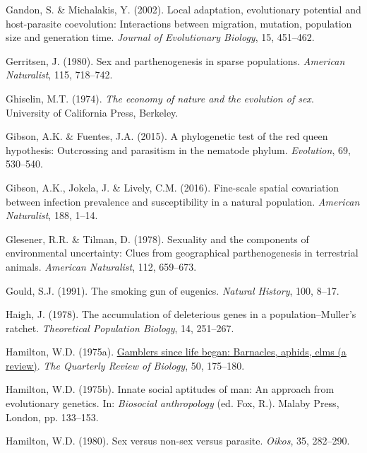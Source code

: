 \documentclass[
  letterpaper,
]{book}
\newlength{\cslhangindent}
\newenvironment{CSLReferences}[2] %
 {\begin{list}{}{%
  \setlength{\itemindent}{0pt}
  \setlength{\leftmargin}{0pt}
  \setlength{\parsep}{0pt}
  \ifodd #1
   \setlength{\leftmargin}{\cslhangindent}
   \setlength{\itemindent}{-1\cslhangindent}
  \fi
  \setlength{\itemsep}{#2\baselineskip}}}
 {\end{list}}
\begin{document}
\begin{CSLReferences}{1}{0}
Gandon, S. \& Michalakis, Y. (2002). Local adaptation, evolutionary
potential and host-parasite coevolution: Interactions between migration,
mutation, population size and generation time. \emph{Journal of
Evolutionary Biology}, 15, 451--462.

Gerritsen, J. (1980). Sex and parthenogenesis in sparse populations.
\emph{American Naturalist}, 115, 718--742.

Ghiselin, M.T. (1974). \emph{The economy of nature and the evolution of
sex}. University of California Press, Berkeley.

Gibson, A.K. \& Fuentes, J.A. (2015). A phylogenetic test of the red
queen hypothesis: Outcrossing and parasitism in the nematode phylum.
\emph{Evolution}, 69, 530--540.

Gibson, A.K., Jokela, J. \& Lively, C.M. (2016). Fine-scale spatial
covariation between infection prevalence and susceptibility in a natural
population. \emph{American Naturalist}, 188, 1--14.

Glesener, R.R. \& Tilman, D. (1978). Sexuality and the components of
environmental uncertainty: Clues from geographical parthenogenesis in
terrestrial animals. \emph{American Naturalist}, 112, 659--673.

Gould, S.J. (1991). The smoking gun of eugenics. \emph{Natural History},
100, 8--17.

Haigh, J. (1978). The accumulation of deleterious genes in a
population--{Muller's} ratchet. \emph{Theoretical Population Biology},
14, 251--267.

Hamilton, W.D. (1975a). \href{https://doi.org/10.1086/408439}{Gamblers
since life began: Barnacles, aphids, elms (a review)}. \emph{The
Quarterly Review of Biology}, 50, 175--180.

Hamilton, W.D. (1975b). Innate social aptitudes of man: An approach from
evolutionary genetics. In: \emph{Biosocial anthropology} (ed. Fox, R.).
Malaby Press, London, pp. 133--153.

Hamilton, W.D. (1980). Sex versus non-sex versus parasite. \emph{Oikos},
35, 282--290.


\end{CSLReferences}
\end{document}
